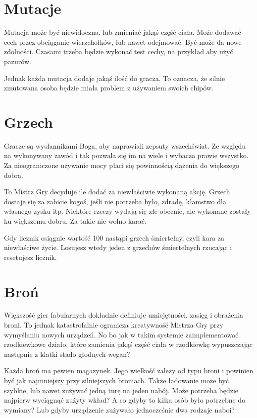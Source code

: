 \section{Mutacje}
Mutacja może być niewidoczna, lub zmieniać jakąś część ciała.
Może dodawać cech przez obciąganie wierzchołków, lub nawet odejmować.
Być może da nowe zdolności.
Czasami trzeba będzie wykonać test cechy, na przykład aby użyć pazurów.

Jednak każda mutacja dodaje jakąś ilość \abnkp{} do gracza.
To oznacza, że silnie zmutowana osoba będzie miała problem z używaniem swoich chipów.

\section{Grzech}
Gracze są wysłannikami Boga, aby naprawiali zepsuty wszechświat.
Ze względu na wykonywany zawód i tak pozwala się im na wiele i wybacza prawie wszystko.
Za nieograniczone używanie mocy płaci się powinnością dążenia do większego dobra.

To Mistrz Gry decyduje ile \abgrz{} dodać za niewłaściwie wykonaną akcję.
Grzech dostaje się za zabicie kogoś, jeśli nie potrzeba było, zdradę, kłamstwo dla własnego zysku itp.
Niektóre rzeczy wydają się złe obecnie, ale wykonane zostały ku większemu dobru. Za takie nie wolno karać.

Gdy licznik \abgrz{} osiągnie wartość 100 nastąpi grzech śmiertelny, czyli kara za niewłaściwe życie.
Losujesz wtedy jeden z grzechów śmiertelnych rzucając \dxx{} i resetujesz licznik.

\section{Broń}
Większość gier fabularnych dokładnie definiuje umiejętności, zasięg i obrażenia broni.
To jednak katastrofalnie ogranicza kreatywność Mistrza Gry przy wymyślaniu nowych urządzeń.
No bo jak w takim systemie zaimplementować rzodkiewkowe działo, które zamienia jakąś część ciała w rzodkiewkę wypuszczając następnie z klatki stado głodnych wegan?

Każda broń ma pewien magazynek.
Jego wielkość zależy od typu broni i powinien być jak najmniejszy przy silniejszych broniach.
Także ładowanie może być szybkie, lub nawet zużywać jedną turę na jeden nabój.
Może potrzeba będzie najpierw wyciągnąć zużyty wkład?
A co gdyby to kilka osób było potrzebne do wymiany?
Lub gdyby urządzenie zużywało jednocześnie dwa rodzaje naboi?

